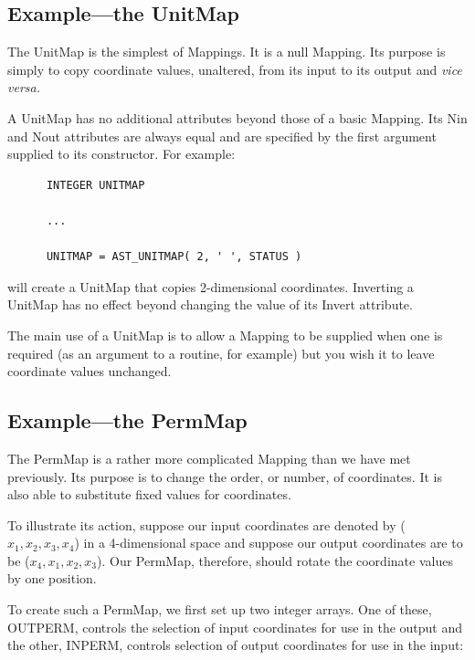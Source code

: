 \documentclass[twoside,11pt]{article}
\newcommand{\htmlref}[2]{#1}
\begin{document}
\subsection{\label{ss:unitmapexample}Example---the UnitMap}

The \htmlref{UnitMap}{UnitMap} is the simplest of Mappings. It is a null \htmlref{Mapping}{Mapping}. Its
purpose is simply to copy coordinate values, unaltered, from its input
to its output and {\em{vice versa.}}

A UnitMap has no additional attributes beyond those of a basic
Mapping. Its \htmlref{Nin}{Nin} and \htmlref{Nout}{Nout} attributes are always equal and are
specified by the first argument supplied to its constructor. For
example:

\small
\begin{verbatim}
      INTEGER UNITMAP

      ...

      UNITMAP = AST_UNITMAP( 2, ' ', STATUS )
\end{verbatim}
\normalsize

will create a UnitMap that copies 2-dimensional coordinates. Inverting
a UnitMap has no effect beyond changing the value of its \htmlref{Invert}{Invert}
attribute.

The main use of a UnitMap is to allow a Mapping to be supplied when one
is required (as an argument to a routine, for example) but you wish
it to leave coordinate values unchanged.

\subsection{\label{ss:permmapexample}Example---the PermMap}

The \htmlref{PermMap}{PermMap} is a rather more complicated \htmlref{Mapping}{Mapping} than we have met
previously.  Its purpose is to change the order, or number, of
coordinates. It is also able to substitute fixed values for
coordinates.

To illustrate its action, suppose our input coordinates are denoted by
($x_1,x_2,x_3,x_4$) in a 4-dimensional space and suppose our output
coordinates are to be ($x_4,x_1,x_2,x_3$). Our PermMap, therefore,
should rotate the coordinate values by one position.

To create such a PermMap, we first set up two integer arrays. One of
these, OUTPERM, controls the selection of input coordinates for use in
the output and the other, INPERM, controls selection of output
coordinates for use in the input:
\end{document}
